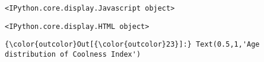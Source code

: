 \documentclass[11pt]{article}
\begin{document}
    
    \begin{verbatim}
<IPython.core.display.Javascript object>
    \end{verbatim}

    
    
    \begin{verbatim}
<IPython.core.display.HTML object>
    \end{verbatim}

    
\begin{Verbatim}[commandchars=\\\{\}]
{\color{outcolor}Out[{\color{outcolor}23}]:} Text(0.5,1,'Age distribution of Coolness Index')
\end{Verbatim}
            

    
    
    
    
\end{document}
